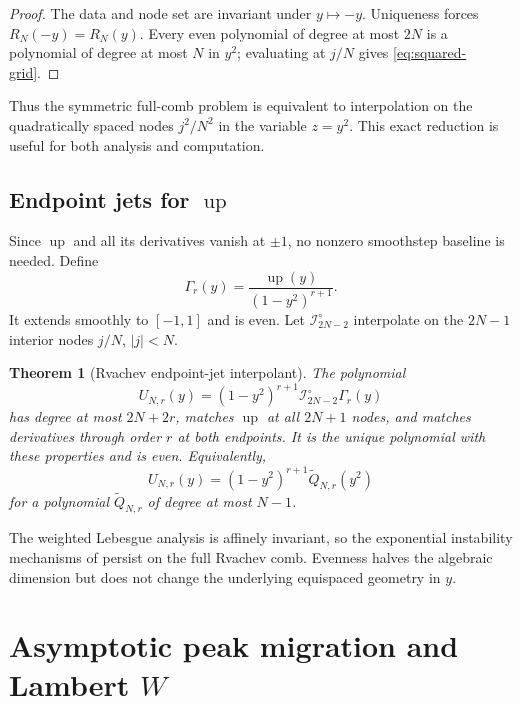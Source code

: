 \documentclass[11pt,oneside]{article}
\newtheorem{theorem}{Theorem}[section]
\theoremstyle{definition}
\theoremstyle{remark}
\newcommand{\Up}{\operatorname{up}}
\newcommand{\Lag}{\mathcal I}
\begin{document}
\begin{proof}
The data and node set are invariant under $y\mapsto-y$.  Uniqueness forces $R_N(-y)=R_N(y)$.  Every even polynomial of degree at most $2N$ is a polynomial of degree at most $N$ in $y^2$; evaluating at $j/N$ gives \eqref{eq:squared-grid}.
\end{proof}

Thus the symmetric full-comb problem is equivalent to interpolation on the quadratically spaced nodes $j^2/N^2$ in the variable $z=y^2$.  This exact reduction is useful for both analysis and computation.

\subsection{Endpoint jets for $\Up$}

Since $\Up$ and all its derivatives vanish at $\pm1$, no nonzero smoothstep baseline is needed.  Define
\begin{equation}
 \Gamma_r(y)=\frac{\Up(y)}{(1-y^2)^{r+1}}.
 \label{eq:gamma-up}
\end{equation}
It extends smoothly to $[-1,1]$ and is even.  Let $\Lag^{\circ}_{2N-2}$ interpolate on the $2N-1$ interior nodes $j/N$, $|j|<N$.

\begin{theorem}[Rvachev endpoint-jet interpolant]
\label{thm:up-jet}
The polynomial
\begin{equation}
 U_{N,r}(y)=(1-y^2)^{r+1}\Lag^{\circ}_{2N-2}\Gamma_r(y)
 \label{eq:up-jet}
\end{equation}
has degree at most $2N+2r$, matches $\Up$ at all $2N+1$ nodes, and matches derivatives through order $r$ at both endpoints.  It is the unique polynomial with these properties and is even.  Equivalently,
\begin{equation}
 U_{N,r}(y)=(1-y^2)^{r+1}\widetilde Q_{N,r}(y^2)
\end{equation}
for a polynomial $\widetilde Q_{N,r}$ of degree at most $N-1$.
\end{theorem}

The weighted Lebesgue analysis is affinely invariant, so the exponential instability mechanisms of  persist on the full Rvachev comb.  Evenness halves the algebraic dimension but does not change the underlying equispaced geometry in $y$.

\section{Asymptotic peak migration and Lambert $W$}
\label{sec:lambert}
\end{document}
